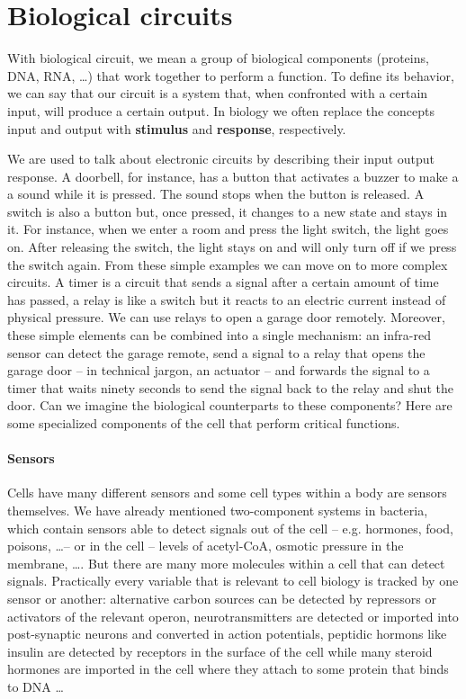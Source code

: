 \section{Biological circuits}

With biological circuit, we mean a group of biological components (proteins, DNA, RNA, \dots ) that work together to perform a function. To define its behavior, we can say that our circuit is a system that, when confronted with a certain input, will produce a certain output. In biology we often replace the concepts input and output with \textbf{stimulus} and \textbf{response}, respectively.

We are used to talk about electronic circuits by describing their input output response. A doorbell, for instance, has a button that activates a buzzer to make a  a sound while it is pressed. The sound stops when the button is released.  A switch is also a button but, once pressed, it changes to a new state and stays in it. For instance, when we enter a room and press the light switch, the light goes on. After releasing the switch, the light stays on and will only turn off if we press the switch again. From these simple examples we can move on to more complex circuits. A  timer is a circuit that sends a signal after a certain amount of time has passed, a relay is like a switch but it reacts to an electric current instead of physical pressure. We can use relays to open a garage door remotely. Moreover, these simple elements can be combined into a single mechanism: an infra-red sensor can detect the garage remote, send a signal to a relay that opens the garage door -- in technical jargon, an actuator -- and forwards the signal to a timer that waits ninety seconds to  send  the signal back to the relay and
 shut the door. Can we imagine the biological counterparts to these components? Here are some specialized components of the cell that perform critical functions.

\paragraph{Sensors} Cells have many different sensors and some cell types within a body are sensors themselves. We have already mentioned two-component systems in bacteria, which contain sensors able to detect signals out of the cell -- e.g. hormones, food, poisons, \dots -- or in the cell -- levels of acetyl-CoA, osmotic pressure in the membrane, \dots. But there are many more molecules within a cell that can detect signals. Practically every variable that is relevant to cell biology is tracked by one sensor or another: alternative carbon sources can be detected by repressors or activators of the relevant operon, neurotransmitters are detected or imported into post-synaptic neurons  and converted in action potentials, peptidic hormons like insulin are detected by receptors in the surface of the cell while many steroid hormones are imported in the cell where they attach to some protein that binds to DNA \dots 

